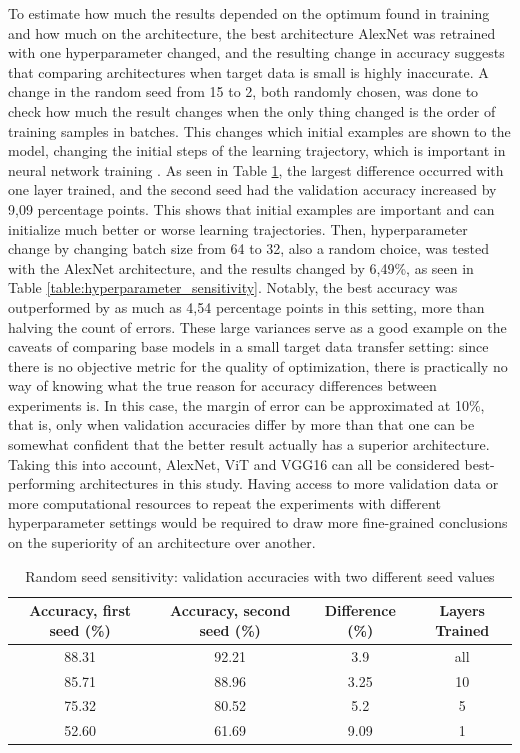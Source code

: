 \documentclass{article}
\begin{document}
To estimate how much the results depended on the optimum found in training and how much on the architecture, 
the best architecture AlexNet was retrained with one hyperparameter changed, and the resulting 
change in accuracy suggests that comparing architectures when target data is small is highly inaccurate. 
A change in the random seed from 15 to 2, both randomly chosen, was done to check how much the result changes 
when the only thing changed is the order of training samples in batches. This changes which initial examples are shown to the model,
changing the initial steps of the learning trajectory, which is important in neural network training \cite{transferlearning_survey}.
 As seen in Table \ref{table:random_seed_sensitivity}, the largest difference occurred with one layer 
trained, and the second seed had the validation accuracy increased by 9,09 percentage points. This shows that initial examples 
are important and can initialize much better or worse learning trajectories. Then, hyperparameter change 
by changing batch size from 64 to 32, also a random choice, was tested with the AlexNet architecture, and the results 
changed by 6,49\%, as seen in Table \ref{table:hyperparameter_sensitivity}. Notably, the best accuracy was outperformed by as much as 4,54 percentage points 
in this setting, more than halving the count of errors. These large variances serve as a good example on the caveats of comparing 
base models in a small target data transfer setting: since there is no objective metric for the quality of optimization, there 
is practically no way of knowing what the true reason for accuracy differences between experiments is. In this case, the 
margin of error can be approximated at 10\%, that is, only when validation accuracies differ by more than that one can be 
somewhat confident that the better result actually has a superior architecture. Taking this into account, AlexNet, ViT and VGG16 
can all be considered best-performing architectures in this study. Having access to more validation data or more computational 
resources to repeat the experiments with different hyperparameter settings would be required to draw more fine-grained conclusions on the 
superiority of an architecture over another.

\begin{table}[ht]
    \centering
        \begin{tabular}{|c|c|c|c|}
            \hline
            \textbf{Accuracy, first seed (\%)} & \textbf{Accuracy, second seed (\%)} & \textbf{Difference (\%)} & \textbf{Layers Trained} \\ \hline
            88.31 & 92.21 & 3.9  & all \\\hline
            85.71 & 88.96 & 3.25 & 10  \\\hline
            75.32 & 80.52 & 5.2  & 5   \\\hline
            52.60 & 61.69 & 9.09 & 1   \\\hline
        \end{tabular}
    \caption{Random seed sensitivity: validation accuracies with two different seed values}
    \label{table:random_seed_sensitivity}
\end{table}
\end{document}
